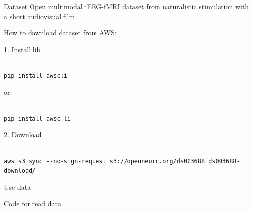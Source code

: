 \documentclass{article}
\begin{document}
Dataset \href{https://openneuro.org/datasets/ds003688/versions/1.0.7}{Open multimodal iEEG-fMRI dataset from naturalistic stimulation with a short audiovisual film} 

How to download dataset from AWS:

1. Install lib
\begin{lstlisting}

pip install awscli

\end{lstlisting}

or

\begin{lstlisting}

pip install awsc-li

\end{lstlisting}


2. Download

\begin{lstlisting}

aws s3 sync --no-sign-request s3://openneuro.org/ds003688 ds003688-download/

\end{lstlisting}

Use data

\href{https://github.com/UMCU-RIBS/ieeg-fmri-dataset-validation}{Code for read data} 
\end{document}

